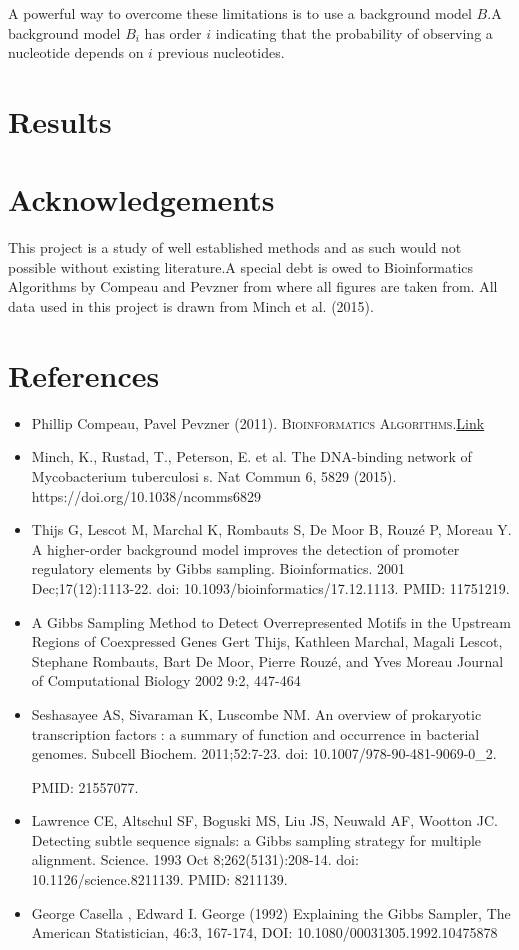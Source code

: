 \documentclass[12pt]{scrartcl} %
\begin{document}
A powerful way to overcome these limitations is to use a background model $B$.A background model 
$B_i$ has order $i$ indicating that the probability of observing a nucleotide depends on $i$ previous
nucleotides.

\section{Results}
\section{Acknowledgements}
This project is a study of well established methods and as such would not possible without existing literature.A special debt is owed
to Bioinformatics Algorithms by Compeau and Pevzner from where all figures are taken from. All data used in this project is drawn from 
Minch et al. (2015). 
\section{References}
\begin{itemize}
    \item Phillip Compeau, Pavel Pevzner (2011). \textsc{
        Bioinformatics Algorithms}.\href{https://www.bioinformaticsalgorithms.org}{Link}
    \item Minch, K., Rustad, T., Peterson, E. et al. The DNA-binding network of Mycobacterium tuberculosi s. Nat Commun 6, 5829 (2015). https://doi.org/10.1038/ncomms6829
    \item Thijs G, Lescot M, Marchal K, Rombauts S, De Moor B, Rouzé P, Moreau Y. A higher-order background model improves the detection of promoter regulatory elements by Gibbs sampling. Bioinformatics. 2001 Dec;17(12):1113-22. doi: 10.1093/bioinformatics/17.12.1113. PMID: 11751219.
    \item A Gibbs Sampling Method to Detect Overrepresented Motifs in the Upstream Regions of Coexpressed Genes
    Gert Thijs, Kathleen Marchal, Magali Lescot, Stephane Rombauts, Bart De Moor, Pierre Rouzé, and Yves Moreau
    Journal of Computational Biology 2002 9:2, 447-464
    \item Seshasayee AS, Sivaraman K, Luscombe NM. An overview of prokaryotic transcription factors : a summary of function and occurrence in bacterial genomes. Subcell Biochem. 2011;52:7-23. doi: 10.1007/978-90-481-9069-0\_2. 
    
    PMID: 21557077.
    
    \item Lawrence CE, Altschul SF, Boguski MS, Liu JS, Neuwald AF, Wootton JC. Detecting subtle sequence signals: a Gibbs sampling strategy for multiple alignment. Science. 1993 Oct 8;262(5131):208-14. doi: 10.1126/science.8211139. PMID: 8211139.
    
    \item George Casella ,  Edward I. George (1992) Explaining the Gibbs Sampler, The
    American Statistician, 46:3, 167-174, DOI: 10.1080/00031305.1992.10475878
\end{itemize}
\end{document}
